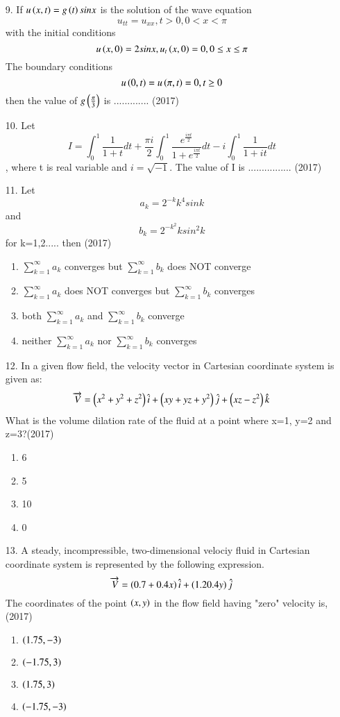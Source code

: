 \documentclass[journal]{IEEEtran}
\begin{document}
\begin{enumerate}
\begin{enumerate}[label = (\Alph*)]
    \end{enumerate}
    \item[9.] If $u\left(x,t\right) = g\left(t\right)sinx$ is the solution of the wave equation\\$$u_{tt} = u_{xx}, t>0, 0<x<\pi$$ 
     with the initial conditions $$u\left(x,0\right)=2sinx, u_t\left(x,0\right)=0, 0\leq x\leq \pi$$ The boundary conditions $$u\left(0,t\right)=u\left(\pi,t\right)=0, t\geq 0$$then the value of $g\left(\frac{\pi}{3}\right)$ is ............. \hfill (2017)
    \item[10.] Let $$I = \int_{0}^{1}\frac{1}{1+t}dt + \frac{\pi i}{2}\int_{0}^{1}\frac{e^{\frac{i\pi t}{2}}}{1+e^{\frac{i\pi t}{2}}}dt - i\int_{0}^{1}\frac{1}{1+it}dt$$, where t is real variable and $i = \sqrt{-1}$. The value of I is ................ \hfill (2017)
    \item[11.] Let $$a_k = 2^{-k}k^4 sink  $$ and $$b_k = 2^{-k^2}ksin^2k$$ for k=1,2..... then \hfill (2017)
    \begin{enumerate}[label=(\Alph*)]
        \item $\sum_{k=1}^{\infty}a_k$ converges but $\sum_{k=1}^{\infty}b_k $ does NOT converge 
        \item $\sum_{k=1}^{\infty}a_k$ does NOT converges but $\sum_{k=1}^{\infty}b_k $ converges 
        \item both $\sum_{k=1}^{\infty}a_k$ and $\sum_{k=1}^{\infty}b_k $ converge 
        \item neither $\sum_{k=1}^{\infty}a_k$ nor $\sum_{k=1}^{\infty}b_k $ converges 
    \end{enumerate}
    \item[12.] In a given flow field, the velocity vector in Cartesian coordinate system is given as:$$\overrightarrow{V}=\left(x^2+y^2+z^2\right)\hat{i} +\left(xy+yz+y^2\right)\hat{j}+\left(xz-z^2\right)\hat{k}  $$What is the volume dilation rate of the fluid at a point where x=1, y=2 and z=3?\hfill (2017)
    \begin{enumerate}[label=(\Alph*)]
        \item 6
        \item 5
        \item 10
        \item 0
    \end{enumerate}
    \item[13.] A steady, incompressible, two-dimensional velociy fluid in Cartesian coordinate system is represented by the following expression.$$\overrightarrow{V} = \left(0.7+0.4x\right)\hat{i} + \left(1.2  0.4y\right)\hat{j}$$The coordinates of the point $\left(x,y\right)$ in the flow field having "zero" velocity is, \hfill (2017)
    \begin{enumerate}[label=(\Alph*)]
        \item $\left(1.75,-3\right)$
        \item $\left(-1.75,3\right)$
        \item $\left(1.75,3\right)$
        \item $\left(-1.75,-3\right)$
    \end{enumerate}
\end{enumerate}
\end{document}
